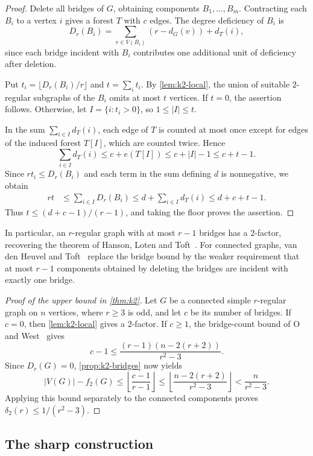\documentclass[11pt]{amsart}
\theoremstyle{remark}
\begin{document}
\begin{proof}
Delete all bridges of $G$, obtaining components $B_1,\ldots,B_m$. Contracting each $B_i$ to a vertex $i$ gives a forest $T$ with $c$ edges. The degree deficiency of $B_i$ is
\[
D_r(B_i)=\sum_{v\in V(B_i)}(r-d_G(v))+d_T(i),
\]
since each bridge incident with $B_i$ contributes one additional unit of deficiency after deletion.

Put $t_i=\lfloor D_r(B_i)/r\rfloor$ and $t=\sum_i t_i$. By \cref{lem:k2-local}, the union of suitable $2$-regular subgraphs of the $B_i$ omits at most $t$ vertices. If $t=0$, the assertion follows. Otherwise, let $I=\{i:t_i>0\}$, so $1\le|I|\le t$.

In the sum $\sum_{i\in I}d_T(i)$, each edge of $T$ is counted at most once except for edges of the induced forest $T[I]$, which are counted twice. Hence
\[
\sum_{i\in I}d_T(i)
\le c+e(T[I])\le c+|I|-1 \le c+t-1.
\]
Since $rt_i\le D_r(B_i)$ and each term in the sum defining $d$ is nonnegative, we obtain
\[
\begin{aligned}
rt
&\le\sum_{i\in I}D_r(B_i)
\le d+\sum_{i\in I}d_T(i)
\le d+c+t-1.
\end{aligned}
\]
Thus $t\le(d+c-1)/(r-1)$, and taking the floor proves the assertion.
\end{proof}

In particular, an $r$-regular graph with at most $r-1$ bridges has a $2$-factor, recovering the theorem of Hanson, Loten and Toft~\cite{HLT1998}. For connected graphs, van den Heuvel and Toft~\cite[Theorem~1.9]{HT2026} replace the bridge bound by the weaker requirement that at most \(r-1\) components obtained by deleting the bridges are incident with exactly one bridge.

\begin{proof}[Proof of the upper bound in \cref{thm:k2}]
Let $G$ be a connected simple $r$-regular graph on $n$ vertices, where $r\ge3$ is odd, and let $c$ be its number of bridges. If $c=0$, then \cref{lem:k2-local} gives a $2$-factor. If $c\ge1$, the bridge-count bound of O and West~\cite[Theorem~3.4]{OW2010} gives
\[
c-1\le\frac{(r-1)(n-2(r+2))}{r^2-3}.
\]
Since $D_r(G)=0$, \cref{prop:k2-bridges} now yields
\[
|V(G)|-f_2(G)
\le\left\lfloor\frac{c-1}{r-1}\right\rfloor
\le\left\lfloor\frac{n-2(r+2)}{r^2-3}\right\rfloor
<\frac{n}{r^2-3}.
\]
Applying this bound separately to the connected components proves $\delta_2(r)\le1/(r^2-3)$.
\end{proof}

\subsection{The sharp construction}\label{subsec:sharp-construction}
\end{document}
